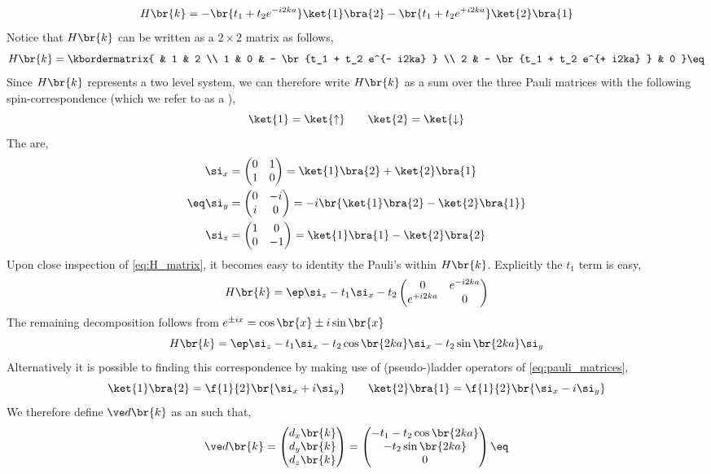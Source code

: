 \documentclass{article}
\begin{document}
\[ H\br{k} = - \br{t_1 + t_2 e^{- i2ka} }\ket{1}\bra{2} - \br{t_1 + t_2 e^{+ i2ka} }\ket{2}\bra{1} \]
Notice that $H\br{k}$ can be written as a $2\times 2$ matrix as follows,
\[ H\br{k} = \kbordermatrix{ & 1 & 2 \\ 1 & 0 & - \br{t_1 + t_2 e^{- i2ka} } \\ 2 & - \br{t_1 + t_2 e^{+ i2ka} } & 0 } \eq \label{eq:H_matrix}\]
Since $H\br{k}$ represents a two level system, we can therefore write $H\br{k}$ as a sum over the three Pauli matrices with the following spin-correspondence (which we refer to as a ),
\[ \ket{1} = \ket{\uparrow} \qquad \ket{2} = \ket{\downarrow} \]
The  are,
\begin{align*}
\eq \label{eq:pauli_matrices}
\begin{split}
\si_x &= \begin{pmatrix} 0 & 1 \\ 1 & 0 \end{pmatrix} = \ket{1} \bra{2} + \ket{2} \bra{1} \\
\si_y &= \begin{pmatrix} 0 & -i \\ i & 0 \end{pmatrix} = -i\br{\ket{1} \bra{2} - \ket{2} \bra{1}} \\
\si_z &= \begin{pmatrix} 1 & 0 \\ 0 & -1 \end{pmatrix} = \ket{1} \bra{1} - \ket{2} \bra{2}
\end{split}
\end{align*}
Upon close inspection of \cref{eq:H_matrix}, it becomes easy to identity the Pauli's within $H\br{k}$. Explicitly the $t_1$ term is easy,
\[ H\br{k} = \ep \si_z - t_1 \si_x - t_2 \begin{pmatrix} 0 & e^{- i2ka} \\ e^{+ i2ka} & 0 \end{pmatrix}\]
The remaining decomposition follows from $e^{\pm ix} = \cos\br{x} \pm i \sin \br{x}$
\[ H\br{k} = \ep \si_z - t_1 \si_x - t_2 \cos\br{2 k a}\si_x - t_2 \sin\br{2 k a}\si_y \]
Alternatively it is possible to finding  this correspondence by making use of (pseudo-)ladder operators of \cref{eq:pauli_matrices},
\[ \ket{1}\bra{2} = \f{1}{2}\br{\si_x + i \si_y} \qquad \ket{2}\bra{1} = \f{1}{2}\br{\si_x - i \si_y} \]
We therefore define $\ve d \br{k}$ as an  such that,
\[ \ve d\br{k} = \begin{pmatrix} d_x\br{k} \\ d_y\br{k} \\ d_z\br{k} \end{pmatrix} = \begin{pmatrix} -t_1 - t_2 \cos\br{2 k a} \\ - t_2 \sin\br{2 k a} \\ 0 \end{pmatrix} \eq \label{eq:dk}\]
\end{document}
